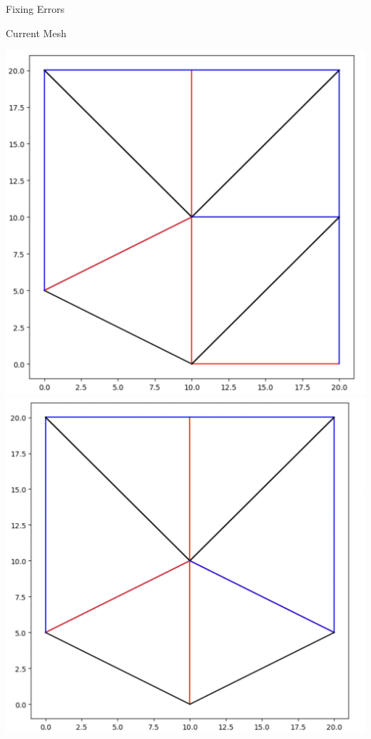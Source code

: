 \begin{frame}{Fixing Errors}
\begin{center}
    
        Current Mesh
        
    \end{center}
    \begin{center}
        \includegraphics[scale=.18]{images/curr1.png}
         \includegraphics[scale=.18]{images/curmesh.png}

\end{center}
\end{frame}
